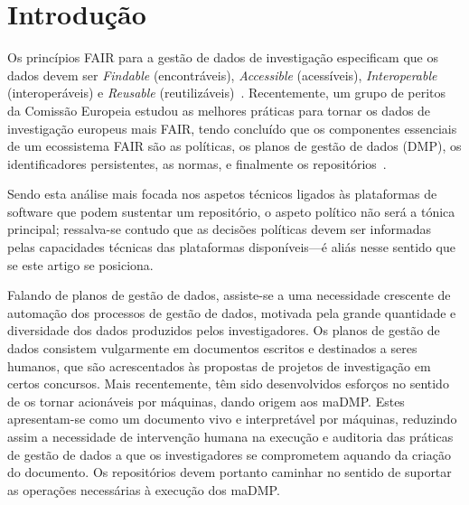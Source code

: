 \documentclass[sigconf,nonacm]{acmart}
\begin{document}

\maketitle

\section{Introdução}

Os princípios \gls{FAIR} para a gestão de dados de investigação especificam que os dados devem ser \emph{Findable} (encontráveis), \emph{Accessible} (acessíveis), \emph{Interoperable} (interoperáveis) e \emph{Reusable} (reutilizáveis)~\cite{wilkinson2016fair}. Recentemente, um grupo de peritos da Comissão Europeia estudou as melhores práticas para tornar os dados de investigação europeus mais FAIR, tendo concluído que os componentes essenciais de um ecossistema \gls{FAIR} são as políticas, os planos de gestão de dados (DMP), os identificadores persistentes, as normas, e finalmente os repositórios~\cite{hodson2018turning}.

Sendo esta análise mais focada nos aspetos técnicos ligados às plataformas de software que podem sustentar um repositório, o aspeto político não será a tónica principal; ressalva-se contudo que as decisões políticas devem ser informadas pelas capacidades técnicas das plataformas disponíveis---é aliás nesse sentido que se este artigo se posiciona.

Falando de planos de gestão de dados, assiste-se a uma necessidade crescente de automação dos processos de gestão de dados, motivada pela grande quantidade e diversidade dos dados produzidos pelos investigadores. Os planos de gestão de dados consistem vulgarmente em documentos escritos e destinados a seres humanos, que são acrescentados às propostas de projetos de investigação em certos concursos. Mais recentemente, têm sido desenvolvidos esforços no sentido de os tornar acionáveis por máquinas, dando origem aos \gls{maDMP}. Estes apresentam-se como um documento vivo e interpretável por máquinas, reduzindo assim a necessidade de intervenção humana na execução e auditoria das práticas de gestão de dados a que os investigadores se comprometem aquando da criação do documento. Os repositórios devem portanto caminhar no sentido de suportar as operações necessárias à execução dos \gls{maDMP}.
\end{document}
